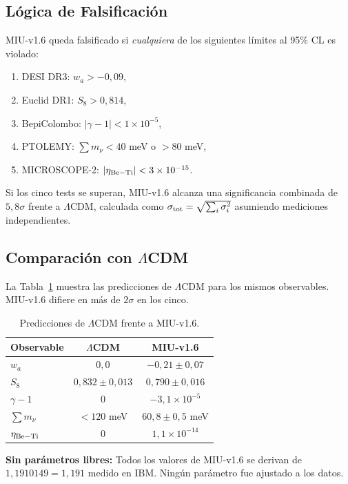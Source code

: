 \documentclass[12pt, a4paper]{article}
\theoremstyle{miuThm}
\theoremstyle{remark}
\newcommand{\qborn}{1{,}1910149}
\begin{document}
\subsection{Lógica de Falsificación}
MIU-v1.6 queda falsificado si \textit{cualquiera} de los siguientes límites al
95\% CL es violado:
\begin{enumerate}
\item DESI DR3: $w_a > -0{,}09$,
\item Euclid DR1: $S_8 > 0{,}814$,
\item BepiColombo: $|\gamma-1| < 1\times10^{-5}$,
\item PTOLEMY: $\sum m_\nu < 40$ meV o $> 80$ meV,
\item MICROSCOPE-2: $|\eta_{\rm Be-Ti}| < 3\times10^{-15}$.
\end{enumerate}
Si los cinco tests se superan, MIU-v1.6 alcanza una significancia combinada de
$5{,}8\sigma$ frente a $\Lambda$CDM, calculada como $\sigma_{\rm tot} = \sqrt{\sum_i \sigma_i^2}$
asumiendo mediciones independientes.

\subsection{Comparación con $\Lambda$CDM}
La Tabla~\ref{tab:lcdm} muestra las predicciones de $\Lambda$CDM para los mismos
observables. MIU-v1.6 difiere en más de $2\sigma$ en los cinco.

\begin{table}[h!]
\centering
\caption{Predicciones de $\Lambda$CDM frente a MIU-v1.6.}
\label{tab:lcdm}
\begin{tabular}{lcc}
\toprule
\textbf{Observable} & \textbf{$\Lambda$CDM} & \textbf{MIU-v1.6} \\
\midrule
$w_a$ & $0{,}0$ & $-0{,}21 \pm 0{,}07$ \\
$S_8$ & $0{,}832 \pm 0{,}013$ & $0{,}790 \pm 0{,}016$ \\
$\gamma-1$ & $0$ & $-3{,}1\times10^{-5}$ \\
$\sum m_\nu$ & $<120$ meV & $60{,}8 \pm 0{,}5$ meV \\
$\eta_{\rm Be-Ti}$ & $0$ & $1{,}1\times10^{-14}$ \\
\bottomrule
\end{tabular}
\end{table}

\textbf{Sin parámetros libres:} Todos los valores de MIU-v1.6 se derivan de
$\qborn = 1{,}191$ medido en IBM. Ningún parámetro fue ajustado a los datos.
\end{document}
